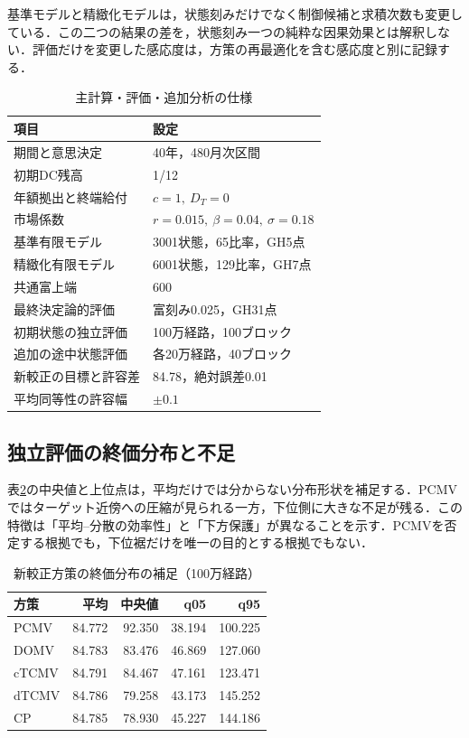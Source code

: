 \documentclass[11pt,a4paper]{article}
\numberwithin{equation}{section}
\numberwithin{table}{section}
\numberwithin{figure}{section}
\theoremstyle{plain}
\theoremstyle{definition}
\begin{document}
基準モデルと精緻化モデルは，状態刻みだけでなく制御候補と求積次数も変更している．この二つの結果の差を，状態刻み一つの純粋な因果効果とは解釈しない．評価だけを変更した感応度は，方策の再最適化を含む感応度と別に記録する．

\begin{table}[htbp]\centering\small
\caption{主計算・評価・追加分析の仕様}\label{tab:spec-detail}
\begin{tabular}{ll}\toprule
項目 & 設定 \\ \midrule
期間と意思決定 & 40年，480月次区間 \\
初期DC残高 & 1/12 \\
年額拠出と終端給付 & $c=1,\ D_T=0$ \\
市場係数 & $r=0.015,\ \beta=0.04,\ \sigma=0.18$ \\
基準有限モデル & 3001状態，65比率，GH5点 \\
精緻化有限モデル & 6001状態，129比率，GH7点 \\
共通富上端 & 600 \\
最終決定論的評価 & 富刻み0.025，GH31点 \\
初期状態の独立評価 & 100万経路，100ブロック \\
追加の途中状態評価 & 各20万経路，40ブロック \\
新較正の目標と許容差 & 84.78，絶対誤差0.01 \\
平均同等性の許容幅 & $\pm0.1$ \\
\bottomrule\end{tabular}\end{table}

\subsection{独立評価の終価分布と不足}
表\ref{tab:full-terminal}の中央値と上位点は，平均だけでは分からない分布形状を補足する．PCMVではターゲット近傍への圧縮が見られる一方，下位側に大きな不足が残る．この特徴は「平均--分散の効率性」と「下方保護」が異なることを示す．PCMVを否定する根拠でも，下位裾だけを唯一の目的とする根拠でもない．

\begin{table}[htbp]\centering\small
\caption{新較正方策の終価分布の補足（100万経路）}\label{tab:full-terminal}
\begin{tabular}{lrrrr}\toprule
方策 & 平均 & 中央値 & q05 & q95 \\ \midrule
PCMV & 84.772 & 92.350 & 38.194 & 100.225 \\
DOMV & 84.783 & 83.476 & 46.869 & 127.060 \\
cTCMV & 84.791 & 84.467 & 47.161 & 123.471 \\
dTCMV & 84.786 & 79.258 & 43.173 & 145.252 \\
CP & 84.785 & 78.930 & 45.227 & 144.186 \\
\bottomrule\end{tabular}\end{table}
\end{document}
